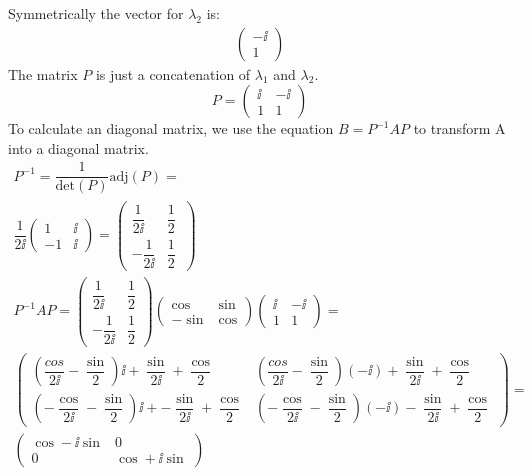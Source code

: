 Symmetrically the vector for $\lambda _2$ is:
\begin{gather*}
\left( \begin{array}{c}
-\ii \\
1
\end{array} \right)
\end{gather*}
The matrix $P$ is just a concatenation of $\lambda _1$ and $\lambda _2$.
\begin{equation}
P = \left( \begin{array}{cc}
\ii & -\ii \\
1 & 1
\end{array} \right)
\end{equation}
To calculate an diagonal matrix, we use the equation $B=P^{-1}AP$ to transform A into a diagonal matrix.
\begin{gather*}
P^{-1} = \dfrac{1}{\text{det}(P)} \text{adj}(P) =\\
\dfrac{1}{2\ii}
\left( \begin{array}{cc}
1 & \ii \\
-1 & \ii
\end{array}
\right)
= 
\left( \begin{array}{cc}
\dfrac{1}{2\ii} & \dfrac{1}{2} \\
- \dfrac{1}{2\ii} & \dfrac{1}{2}
\end{array}
\
\right)
\\
P^{-1}AP =
\left( \begin{array}{cc}
\dfrac{1}{2\ii} & \dfrac{1}{2} \\
- \dfrac{1}{2\ii} & \dfrac{1}{2}
\end{array}
\right)
\left( \begin{array}{cc}
\cos & \sin \\
-\sin & \cos
\end{array}
\right)
\left( \begin{array}{cc}
\ii & -\ii \\
1 & 1
\end{array}
\right)
=\\
\left( \begin{array}{cc}
\left( \dfrac{cos}{2\ii} - \dfrac{\sin}{2} \right)\ii + \dfrac{\sin}{2 \ii} + \dfrac{\cos}{2} &
\left( \dfrac{cos}{2 \ii} - \dfrac{\sin}{2} \right)(-\ii) + \dfrac{\sin}{2 \ii}+\dfrac{\cos}{2} \\
\left( - \dfrac{\cos}{2 \ii} - \dfrac{\sin}{2} \right)\ii + -\dfrac{\sin}{2 \ii} + \dfrac{\cos}{2} &
\left( - \dfrac{\cos}{2 \ii} - \dfrac{\sin}{2} \right)(-\ii) - \dfrac{\sin}{2 \ii} + \dfrac{\cos}{2}
\end{array}
\right)
=\\
\left( \begin{array}{cc}
\cos - \ii \sin & 0\\
 0 & \cos + \ii \sin 
\end{array}
\right)
\end{gather*}
